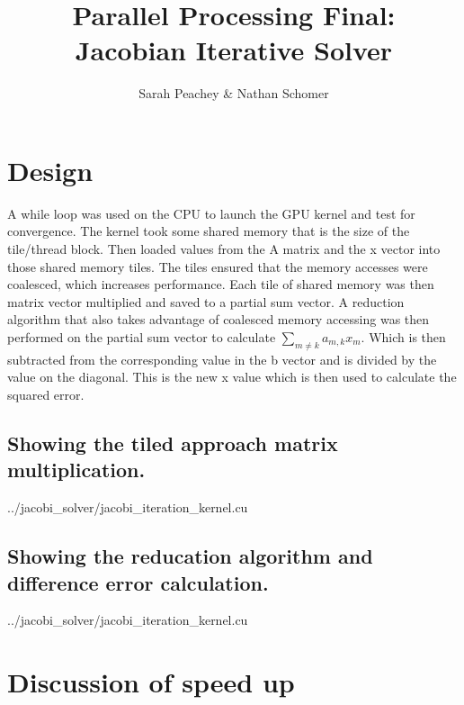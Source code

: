 \documentclass[12pt]{article}
\begin{document}
\title{Parallel Processing Final: \\Jacobian Iterative Solver}
\author{Sarah Peachey \& Nathan Schomer}
\maketitle

\vspace{-1.5cm}
\section{Design}
\vspace{-0.25cm}

\qquad A while loop was used on the CPU to launch the GPU kernel and test
for convergence. The kernel took some shared memory that is the
size of the tile/thread block. Then loaded values from the A matrix and the
x vector into those shared memory tiles. The tiles ensured that the memory
accesses were coalesced, which increases performance. Each tile of shared
memory was then matrix vector multiplied and saved to a partial sum vector.
A reduction algorithm that also takes advantage of coalesced memory accessing 
was then performed on the partial sum vector to
calculate $\sum_{m\neq k}a_{m,k}x_m$. Which is then subtracted from the
corresponding value
in the b vector and is divided by the value on the diagonal. This is the new
x value which is then used to calculate the squared error.  

\newpage

\subsection{Showing the tiled approach matrix multiplication.} 

{../jacobi_solver/jacobi_iteration_kernel.cu }

\subsection{Showing the reducation algorithm and difference error calculation.}

{../jacobi_solver/jacobi_iteration_kernel.cu }


\pagebreak
\vspace{-0.6cm}
\section{Discussion of speed up}
\vspace{-0.4cm}
\end{document}

